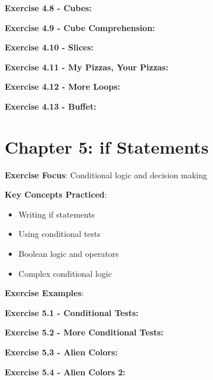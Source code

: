 \textbf{Exercise 4.8 - Cubes:}


\textbf{Exercise 4.9 - Cube Comprehension:}


\textbf{Exercise 4.10 - Slices:}


\textbf{Exercise 4.11 - My Pizzas, Your Pizzas:}


\textbf{Exercise 4.12 - More Loops:}


\textbf{Exercise 4.13 - Buffet:}


\section*{Chapter 5: if Statements}
\textbf{Exercise Focus}: Conditional logic and decision making

\textbf{Key Concepts Practiced}:
\begin{itemize}
    \item Writing if statements
    \item Using conditional tests
    \item Boolean logic and operators
    \item Complex conditional logic
\end{itemize}

\textbf{Exercise Examples}:

\textbf{Exercise 5.1 - Conditional Tests:}


\textbf{Exercise 5.2 - More Conditional Tests:}


\textbf{Exercise 5.3 - Alien Colors:}


\textbf{Exercise 5.4 - Alien Colors 2:}


